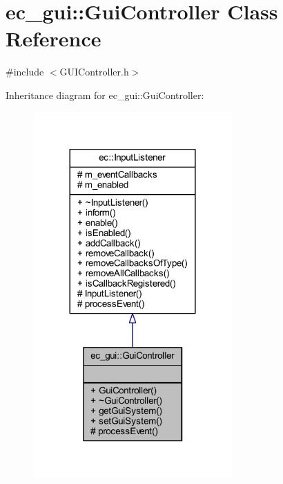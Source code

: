 \hypertarget{classec__gui_1_1_gui_controller}{}\section{ec\+\_\+gui\+:\+:Gui\+Controller Class Reference}
\label{classec__gui_1_1_gui_controller}


{\ttfamily \#include $<$G\+U\+I\+Controller.\+h$>$}



Inheritance diagram for ec\+\_\+gui\+:\+:Gui\+Controller\+:\nopagebreak
\begin{figure}[H]
\begin{center}
\leavevmode
\includegraphics[width=216pt]{classec__gui_1_1_gui_controller__inherit__graph}
\end{center}
\end{figure}


